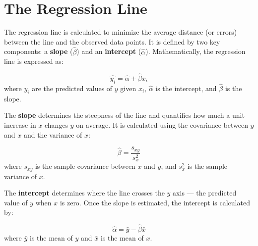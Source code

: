 \documentclass[
  11pt,
  letterpaper,
  DIV=11,
  numbers=noendperiod,
  oneside,
  open=any]{scrreprt}
\begin{document}
\section{The Regression Line}\label{the-regression-line}

The regression line is calculated to minimize the average distance (or
errors) between the line and the observed data points. It is defined by
two key components: a \textbf{slope} (\(\hat{\beta}\)) and an
\textbf{intercept} (\(\hat{\alpha}\)). Mathematically, the regression
line is expressed as:

\begin{bsformula}

\[\hat{y_i}=\hat{\alpha}+\hat{\beta}x_i\] where \(\hat{y_i}\) are the
predicted values of \(y\) given \(x_i\), \(\hat{\alpha}\) is the
intercept, and \(\hat{\beta}\) is the slope.

\end{bsformula}

The \textbf{slope} determines the steepness of the line and quantifies
how much a unit increase in \(x\) changes \(y\) on average. It is
calculated using the covariance between \(y\) and \(x\) and the variance
of \(x\):

\begin{bsformula}

\[\hat{\beta}= \frac{s_{xy}}{s_{x}^2}\] where \(s_{xy}\) is the sample
covariance between \(x\) and \(y\), and \(s_x^2\) is the sample variance
of \(x\).

\end{bsformula}

The \textbf{intercept} determines where the line crosses the \(y\) axis
--- the predicted value of \(y\) when \(x\) is zero. Once the slope is
estimated, the intercept is calculated by:

\begin{bsformula}

\[\hat{\alpha}=\bar{y}-\hat{\beta}\bar{x}\] where \(\bar{y}\) is the
mean of \(y\) and \(\bar{x}\) is the mean of \(x\).

\end{bsformula}
\end{document}
